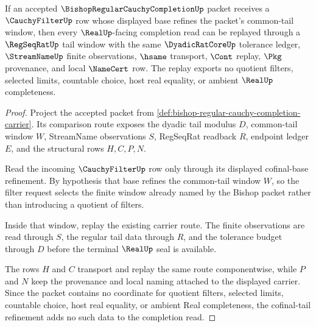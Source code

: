 \begin{theorem}
\label{thm:bishop-regular-cauchy-completion-cofinal-tail-refinement}
If an accepted $\BishopRegularCauchyCompletionUp$ packet receives a $\CauchyFilterUp$ row whose displayed base refines the packet's common-tail window, then every $\RealUp$-facing completion read can be replayed through a $\RegSeqRatUp$ tail window with the same $\DyadicRatCoreUp$ tolerance ledger, $\StreamNameUp$ finite observations, $\hsame$ transport, $\Cont$ replay, $\Pkg$ provenance, and local $\NameCert$ row. The replay exports no quotient filters, selected limits, countable choice, host real equality, or ambient $\RealUp$ completeness.
\end{theorem}
\begin{proof}
Project the accepted packet from \autoref{def:bishop-regular-cauchy-completion-carrier}. Its comparison route exposes the dyadic tail modulus $D$, common-tail window $W$, StreamName observations $S$, RegSeqRat readback $R$, endpoint ledger $E$, and the structural rows $H,C,P,N$.

Read the incoming $\CauchyFilterUp$ row only through its displayed cofinal-base refinement. By hypothesis that base refines the common-tail window $W$, so the filter request selects the finite window already named by the Bishop packet rather than introducing a quotient of filters.

Inside that window, replay the existing carrier route. The finite observations are read through $S$, the regular tail data through $R$, and the tolerance budget through $D$ before the terminal $\RealUp$ seal is available.

The rows $H$ and $C$ transport and replay the same route componentwise, while $P$ and $N$ keep the provenance and local naming attached to the displayed carrier. Since the packet contains no coordinate for quotient filters, selected limits, countable choice, host real equality, or ambient Real completeness, the cofinal-tail refinement adds no such data to the completion read.
\end{proof}

